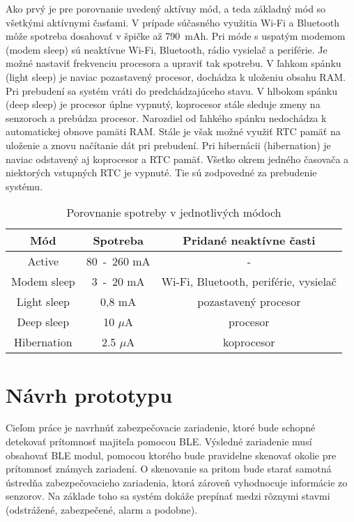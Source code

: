 Ako prvý je pre porovnanie uvedený aktívny mód, a teda základný mód so všetkými aktívnymi časťami. V prípade súčasného využitia Wi-Fi a Bluetooth môže spotreba dosahovať v špičke až 790~mAh. Pri móde s uspatým modemom (modem sleep) sú neaktívne Wi-Fi, Bluetooth, rádio vysielač a periférie. Je možné nastaviť frekvenciu procesora a upraviť tak spotrebu. V ľahkom spánku (light sleep) je naviac pozastavený procesor, dochádza k uloženiu obsahu RAM. Pri prebudení sa systém vráti do predchádzajúceho stavu. V hlbokom spánku (deep sleep) je procesor úplne vypnutý, koprocesor stále sleduje zmeny na senzoroch a prebúdza procesor. Narozdiel od ľahkého spánku nedochádza k automatickej obnove pamäti RAM. Stále je však možné využiť RTC pamäť na uloženie a znovu načítanie dát pri prebudení. Pri hibernácii (hibernation) je naviac odstavený aj koprocesor a RTC pamäť. Všetko okrem jedného časovača a niektorých vstupných RTC je vypnuté. Tie sú zodpovedné za prebudenie systému.\cite{esp-sleep}

\begin{table}[ht]
    \centering
    \renewcommand{\arraystretch}{1.5}
    \begin{tabular}{|c|c|c|}
        \hline
        Mód & Spotreba & Pridané neaktívne časti \\ \hline
        Active & 80~-~260 mA\footnotemark[5] & - \\ \hline
        Modem sleep & 3~-~20 mA & Wi-Fi, Bluetooth, periférie, vysielač\\ \hline
        Light sleep & 0,8 mA & pozastavený procesor\\ \hline
        Deep sleep & 10 $\mu$A & procesor\\ \hline
        Hibernation & 2.5 $\mu$A & koprocesor\\ \hline
    \end{tabular}
    \caption{Porovnanie spotreby v jednotlivých módoch\cite{esp-sleep}}
    \label{tab:spotreba_esp}
\end{table}

\chapter{Návrh prototypu}

Cieľom práce je navrhnúť zabezpečovacie zariadenie, ktoré bude schopné detekovať prítomnosť majiteľa pomocou BLE. Výsledné zariadenie musí obsahovať BLE modul, pomocou ktorého bude pravidelne skenovať okolie pre prítomnosť známych zariadení. O skenovanie sa pritom bude starať samotná ústredňa zabezpečovacieho zariadenia, ktorá zároveň vyhodnocuje informácie zo senzorov. Na základe toho sa systém dokáže prepínať medzi rôznymi stavmi (odstrážené, zabezpečené, alarm a podobne).

